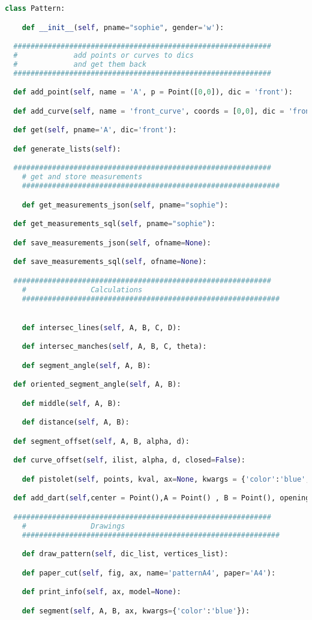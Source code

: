\documentclass[11pt,a4paper]{report}
\begin{document}
\begin{lstlisting}[language=python]
class Pattern:

	def __init__(self, pname="sophie", gender='w'):

  ############################################################
  #				add points or curves to dics
  #				and get them back
  ############################################################

  def add_point(self, name = 'A', p = Point([0,0]), dic = 'front'):

  def add_curve(self, name = 'front_curve', coords = [0,0], dic = 'front'):

  def get(self, pname='A', dic='front'):

  def generate_lists(self):

  ############################################################
	# get and store measurements
	############################################################

	def get_measurements_json(self, pname="sophie"):

  def get_measurements_sql(self, pname="sophie"):

  def save_measurements_json(self, ofname=None):

  def save_measurements_sql(self, ofname=None):

  ############################################################
	#				Calculations
	############################################################


	def intersec_lines(self, A, B, C, D):

	def intersec_manches(self, A, B, C, theta):

	def segment_angle(self, A, B):

  def oriented_segment_angle(self, A, B):

	def middle(self, A, B):

	def distance(self, A, B):

  def segment_offset(self, A, B, alpha, d):

  def curve_offset(self, ilist, alpha, d, closed=False):

	def pistolet(self, points, kval, ax=None, kwargs = {'color':'blue','linestyle':'solid'}, tot=False):

  def add_dart(self,center = Point(),A = Point() , B = Point(), opening = 0, draw_curves = False, order = 'lr', rotate_end = 'none'):

  ############################################################
	#				Drawings
	############################################################

	def draw_pattern(self, dic_list, vertices_list):

	def paper_cut(self, fig, ax, name='patternA4', paper='A4'):

	def print_info(self, ax, model=None):

	def segment(self, A, B, ax, kwargs={'color':'blue'}):

\end{lstlisting}
\end{document}
